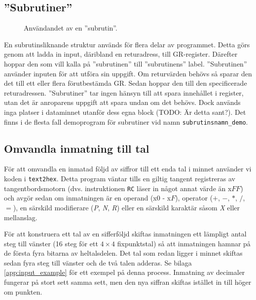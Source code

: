\documentclass[]{article}
\begin{document}
\subsection{''Subrutiner''}
\begin{figure}[h!]
	\caption{Användandet av en ''subrutin''. }
\end{figure}

En subrutinsliknande struktur används för flera delar av programmet. Detta görs genom att ladda in input, däribland en returadress, till GR-register. Därefter hoppar den som vill kalla på ''subrutinen'' till ''subrutinens'' label. ''Subrutinen'' använder inputen för att utföra sin uppgift. Om returvärden behövs så sparar den det till ett eller flera förutbestämda GR. Sedan hoppar den till den specificerade returadressen. ''Subrutiner'' tar ingen hänsyn till att spara innehållet i register, utan det är anroparens uppgift att spara undan om det behövs. Dock används inga platser i dataminnet utanför dess egna block (TODO: Är detta sant?). Det finns i de flesta fall demoprogram för subrutiner vid namn \texttt{subrutinsnamn\_demo}.

\subsection{Omvandla inmatning till tal}\label{sec:text2hex}
För att omvandla en inmatad följd av siffror till ett enda tal i minnet använder vi koden i \texttt{text2hex}. Detta program väntar tills en giltig tangent registreras av tangentbordsmotorn (dvs. instruktionen \texttt{RC} läser in något annat värde än x$FF$) och avgör sedan om inmatningen är en operand (x$0$ - x$F$), operator ($+$, $-$, $*$, $/$, $=$), en särskild modifierare (\textit{P}, \textit{N}, \textit{R}) eller en särskild karaktär såsom \textit{X} eller mellanslag.

För att konstruera ett tal av en sifferföljd skiftas inmatningen ett lämpligt antal steg till vänster (16 steg för ett $4 \times 4$ fixpunktstal) så att inmatningen hamnar på de första fyra bitarna av heltalsdelen. Det tal som redan ligger i minnet skiftas sedan fyra steg till vänster och de två talen adderas. Se bilaga \ref{app:input_example} för ett exempel på denna process. Inmatning av decimaler fungerar på stort sett samma sett, men den nya siffran skiftas istället in till höger om punkten.
\end{document}

